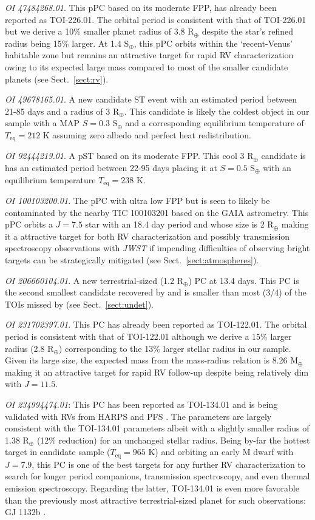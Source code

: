\emph{OI 47484268.01}. This pPC based on its moderate FPP, has already been reported as TOI-226.01.
The \pipeline{} orbital period is consistent with that of TOI-226.01 but we derive a 10\% smaller
planet radius of 3.8 R$_{\oplus}$ despite the star's refined radius being 15\% larger. At 1.4 S$_{\oplus}$,
this pPC orbits within the `recent-Venus' habitable zone but remains an attractive target for rapid RV
characterization owing to its expected large mass compared to most of the smaller candidate planets (see
Sect.~\ref{sect:rv}).

\emph{OI 49678165.01}. A new candidate ST event with an estimated period between 21-85 days and a radius of
3 R$_{\oplus}$. This candidate is likely the coldest object in our sample with a MAP $S=0.3$ S$_{\oplus}$
and a corresponding equilibrium temperature of $T_{\text{eq}}= 212$ K assuming zero albedo and perfect heat redistribution.

\emph{OI 92444219.01}. A pST based on its moderate FPP. This cool 3 R$_{\oplus}$ candidate is
has an estimated period between 22-95 days placing it at $S=0.5$ S$_{\oplus}$ with
an equilibrium temperature $T_{\text{eq}}= 238$ K.

\emph{OI 100103200.01}. The pPC with ultra low FPP but is seen to likely be contaminated by the nearby
TIC 100103201 based on the GAIA astrometry. This pPC orbits a $J=7.5$ star with an 18.4 day period and
whose size is 2 R$_{\oplus}$ making it a attractive target for both RV characterization and possibly
transmission spectroscopy observations with \emph{JWST} if impending difficulties of observing
bright targets can be strategically mitigated (see Sect.~\ref{sect:atmospheres}).

\emph{OI 206660104.01}. A new terrestrial-sized (1.2 R$_{\oplus}$) PC at 13.4 days. This PC is the
second smallest candidate recovered by \pipeline{} and is smaller than most (3/4) of the TOIs missed by
\pipeline{} (see Sect.~\ref{sect:undet}).

\emph{OI 231702397.01}. This PC has already been reported as TOI-122.01. The \pipeline{} orbital
period is consistent with that of TOI-122.01 although we derive a 15\% larger radius (2.8 R$_{\oplus}$)
corresponding to the 13\% larger stellar radius in our sample. Given its large size, the expected
mass from the \cite{chen17} mass-radius relation is 8.26 M$_{\oplus}$ making it an attractive target
for rapid RV follow-up despite being relatively dim with $J=11.5$.

\emph{OI 234994474.01}: This PC has been reported as TOI-134.01 and is being validated with RVs
from HARPS and PFS \citep{astudillodefru19}. The \pipeline{} parameters are largely consistent with the TOI-134.01
parameters albeit with a slightly smaller radius of 1.38 R$_{\oplus}$ (12\% reduction) for
an unchanged stellar radius. Being by-far the hottest target in candidate sample ($T_{\text{eq}}=965$ K)
and orbiting an early M dwarf with $J=7.9$, this PC is one of the best targets for any further RV
characterization to search for longer period companions, transmission spectroscopy, and even thermal
emission spectroscopy. Regarding the latter, TOI-134.01
is even more favorable than the previously most attractive
terrestrial-sized planet for such observations: GJ 1132b \citep{morley17}.


